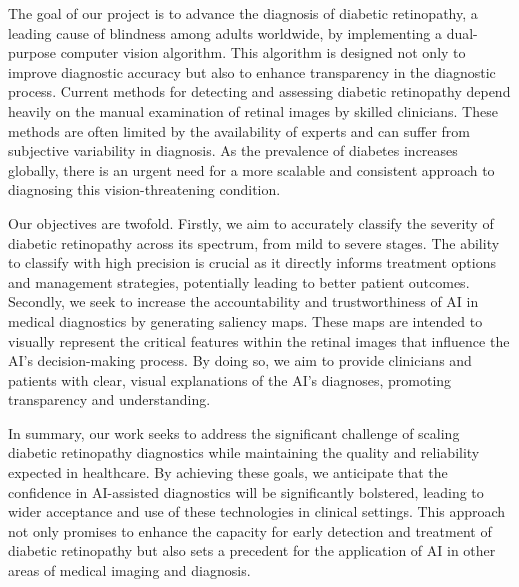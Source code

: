 The goal of our project is to advance the diagnosis of diabetic retinopathy, a leading cause of blindness among adults worldwide, by implementing a dual-purpose computer vision algorithm. This algorithm is designed not only to improve diagnostic accuracy but also to enhance transparency in the diagnostic process. Current methods for detecting and assessing diabetic retinopathy depend heavily on the manual examination of retinal images by skilled clinicians. These methods are often limited by the availability of experts and can suffer from subjective variability in diagnosis. As the prevalence of diabetes increases globally, there is an urgent need for a more scalable and consistent approach to diagnosing this vision-threatening condition.

Our objectives are twofold. Firstly, we aim to accurately classify the severity of diabetic retinopathy across its spectrum, from mild to severe stages. The ability to classify with high precision is crucial as it directly informs treatment options and management strategies, potentially leading to better patient outcomes. Secondly, we seek to increase the accountability and trustworthiness of AI in medical diagnostics by generating saliency maps. These maps are intended to visually represent the critical features within the retinal images that influence the AI's decision-making process. By doing so, we aim to provide clinicians and patients with clear, visual explanations of the AI's diagnoses, promoting transparency and understanding.

In summary, our work seeks to address the significant challenge of scaling diabetic retinopathy diagnostics while maintaining the quality and reliability expected in healthcare. By achieving these goals, we anticipate that the confidence in AI-assisted diagnostics will be significantly bolstered, leading to wider acceptance and use of these technologies in clinical settings. This approach not only promises to enhance the capacity for early detection and treatment of diabetic retinopathy but also sets a precedent for the application of AI in other areas of medical imaging and diagnosis.